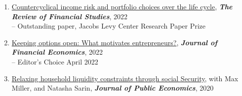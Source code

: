 \documentclass[6pt,letterpaper]{article}
\begin{document}
\begin{enumerate}
	\vspace{.1cm}
	\item {\href{https://sylcath.github.io/sylvaincatherine.net/files/CounterCyclicalRisk.pdf}{Countercyclical income risk and portfolio choices over the life cycle}}, \textit{\textbf{The Review of Financial Studies}}, 2022 \\
	{\small -- Outstanding paper, Jacobs Levy Center Research Paper Prize } 
	\item {\href{https://sylcath.github.io/sylvaincatherine.net/files/KeepingOptionsOpen.pdf}{Keeping options open: What motivates entrepreneurs?}}, \textit{\textbf{Journal of Financial Economics}},
	2022  \vspace{.1cm} \\
	{\small  -- Editor's Choice April 2022 } 
	\item  \href{https://sylcath.github.io/sylvaincatherine.net/files/CMS_JPubE.pdf}{Relaxing household liquidity constraints through social Security}, with Max Miller, and Natasha Sarin, \textbf{\textit{Journal of Public Economics}}, 2020  \vspace{.1cm} \\
\end{enumerate}

\newpage
\end{document}
